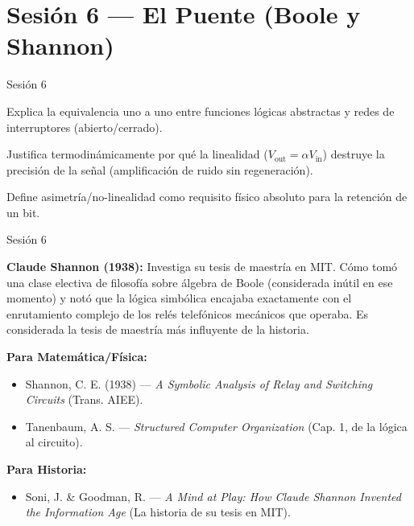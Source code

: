 \documentclass[11pt, letterpaper]{article}
\begin{document}
\newpage

\section{Sesi\'on 6 --- El Puente (Boole y Shannon)}

\begin{verificacion}{Sesi\'on 6}
\begin{checklist}
  \item Explica la equivalencia uno a uno entre funciones l\'ogicas abstractas y redes de interruptores (abierto/cerrado).
  \item Justifica termodin\'amicamente por qu\'e la linealidad ($V_\text{out}=\alpha V_\text{in}$) destruye la precisi\'on de la se\~nal (amplificaci\'on de ruido sin regeneraci\'on).
  \item Define asimetr\'ia/no-linealidad como requisito f\'isico absoluto para la retenci\'on de un bit.
\end{checklist}
\end{verificacion}

\begin{historia}{Sesi\'on 6}
\begin{checklist}
  \item \textbf{Claude Shannon (1938):} Investiga su tesis de maestr\'ia en MIT. C\'omo tom\'o una clase electiva de filosof\'ia sobre \'algebra de Boole (considerada in\'util en ese momento) y not\'o que la l\'ogica simb\'olica encajaba exactamente con el enrutamiento complejo de los rel\'es telef\'onicos mec\'anicos que operaba. Es considerada la tesis de maestr\'ia m\'as influyente de la historia.
\end{checklist}
\end{historia}

\begin{referencias}
\textbf{Para Matem\'atica/F\'isica:}
\begin{itemize}
    \item Shannon, C. E. (1938) --- \textit{A Symbolic Analysis of Relay and Switching Circuits} (Trans. AIEE).
    \item Tanenbaum, A. S. --- \textit{Structured Computer Organization} (Cap. 1, de la l\'ogica al circuito).
\end{itemize}
\textbf{Para Historia:}
\begin{itemize}
    \item Soni, J. \& Goodman, R. --- \textit{A Mind at Play: How Claude Shannon Invented the Information Age} (La historia de su tesis en MIT).
\end{itemize}
\end{referencias}
\end{document}
